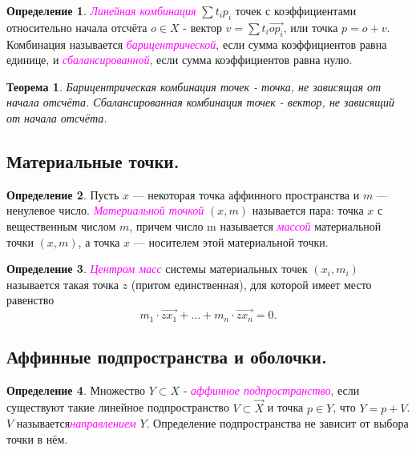 \documentclass[a4paper,100pt]{article}
\theoremstyle{indented}
\newtheorem{theorem}{Теорема}
\theoremstyle{definition}
\newtheorem{defn}{Определение}
\theoremstyle{remark}
\begin{document}
\begin{defn}
    \textit{\textcolor{magenta}{\hypertarget{s7}{Линейная комбинация}}} $\sum t_i p_i$ точек с коэффициентами относительно начала отсчёта $o\in X$ - вектор $v = \sum t_i \vec{op_i}$, или точка $p=o+v$. Комбинация называется \textit{\textcolor{magenta}{\hypertarget{s8}{барицентрической}}}, если сумма коэффициентов равна единице, и \textit{\textcolor{magenta}{\hypertarget{s9}{сбалансированной}}}, если сумма коэффициентов равна нулю.
\end{defn}

\begin{theorem}
    Барицентрическая комбинация точек - точка, не зависящая от начала отсчёта. Сбалансированная комбинация точек - вектор, не зависящий от начала отсчёта.
\end{theorem}

\subsection{Материальные точки.}

\begin{defn}
    Пусть $x$ — некоторая точка аффинного пространства и $m$ — ненулевое число. \textit{\textcolor{magenta}{\hypertarget{s10}{Материальной точкой}}} $(x,m)$ называется пара: точка $x$ с вещественным числом $m$, причем число m называется \textit{\textcolor{magenta}{\hypertarget{s11}{массой}}} материальной точки $(x,m)$, а точка $x$ — носителем этой материальной точки.
\end{defn}

\begin{defn}
    \textit{\textcolor{magenta}{\hypertarget{s12}{Центром масс}}} системы материальных точек $(x_i, m_i)$ называется такая точка $z$ (притом единственная), для которой имеет место равенство
    \[
        m_1 \cdot \vec{zx_1} + \ldots + m_n \cdot \vec{zx_n} = 0. 
    \]
\end{defn}

\subsection{Аффинные подпространства и оболочки.}

\begin{defn}
    Множество $Y\subset X$ - \textit{\textcolor{magenta}{\hypertarget{s13}{аффинное подпространство}}}, если существуют такие линейное подпространство $V\subset \vec{X}$ и точка $p\in Y$, что $Y=p+V$. $V$ называется\textit{\textcolor{magenta}{\hypertarget{s14}{направлением}}} $Y$. Определение подпространства не зависит от выбора точки в нём.
\end{defn}
\end{document}
